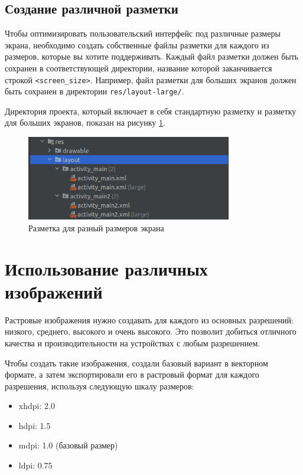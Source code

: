 \subsection{Создание различной разметки}
Чтобы оптимизировать пользовательский интерфейс под различные размеры
экрана, необходимо создать собственные файлы разметки для каждого из
размеров, которые вы хотите поддерживать. Каждый файл разметки должен
быть сохранен в соответствующей директории, название которой
заканчивается строкой \texttt{<screen\_size>}. Например, файл разметки для
больших экранов должен быть сохранен в директории \texttt{res/layout-large/}.

Директория проекта, который включает в себя стандартную разметку и разметку
для больших экранов, показан на рисунку \ref{fig:res:layout}.
\begin{figure}[h!tp]
	\centering
	\includegraphics[width=0.8\textwidth]{Screenshot from 2023-02-20 19-31-44.png}
	\caption{Разметка для разный размеров экрана}
	\label{fig:res:layout}
\end{figure}

\section{Использование различных изображений}
Растровые изображения нужно создавать для каждого из основных
разрешений: низкого, среднего, высокого и очень высокого. Это позволит
добиться отличного качества и производительности на устройствах с любым
разрешением.\par
Чтобы создать такие изображения, создали базовый вариант в векторном
формате, а затем экспортировали его в растровый формат для каждого
разрешения, используя следующую шкалу размеров:

\begin{itemize}
	\item xhdpi: 2.0
	\item hdpi: 1.5
	\item mdpi: 1.0 (базовый размер)
	\item ldpi: 0.75
\end{itemize}

